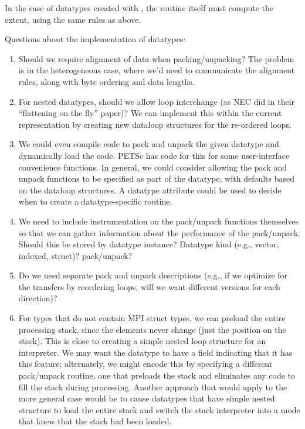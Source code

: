 \documentclass{article}
\begin{document}
In the case of datatypes created with , the
routine itself must compute the extent, using the same rules as above.

Questions about the implementation of datatypes:

\begin{enumerate}
\item Should we require alignment of data when packing/unpacking?  The
   problem is in the heterogeneous case, where we'd need to communicate
   the alignment rules, along with byte ordering and data lengths.

\item For nested datatypes, should we allow loop interchange (as NEC did
   in their ``flattening on the fly'' paper)?  We can implement this
   within the current representation by creating new dataloop
   structures for the re-ordered loops.  


\item We could even compile code to pack and unpack the given datatype
   and dynamically load the code.  PETSc has code for this for some
   user-interface convenience functions.  In general, we could
   consider allowing the pack and unpack functions to be specified as
   part of the datatype, with defaults based on the dataloop
   structures.  A datatype attribute could be used to decide when to
   create a datatype-specific routine.

\item We need to include instrumentation on the pack/unpack functions
   themselves so that we can gather information about the performance
   of the pack/unpack.  Should this be stored by datatype instance?
   Datatype kind (e.g., vector, indexed, struct)?  pack/unpack?

\item Do we need separate pack and unpack descriptions (e.g., if we
   optimize for the transfers by reordering loops, will we want
   different versions for each direction)?


\item For types that do not contain MPI struct types, we can preload the entire
   processing stack, since the elements never change (just the
   position on the stack).  This is close to creating a simple nested
   loop structure for an interpreter.  We may want the datatype to
   have a field indicating that it has this feature; alternately, we
   might encode this by specifying a different pack/unpack routine,
   one that preloads the stack and eliminates any code to fill the
   stack during processing.  Another approach that would apply to the
   more general case would be to cause datatypes that have simple
   nested structure to load the entire stack and switch the stack
   interpreter into a mode that knew that the stack had been loaded.


\end{enumerate}
\end{document}
